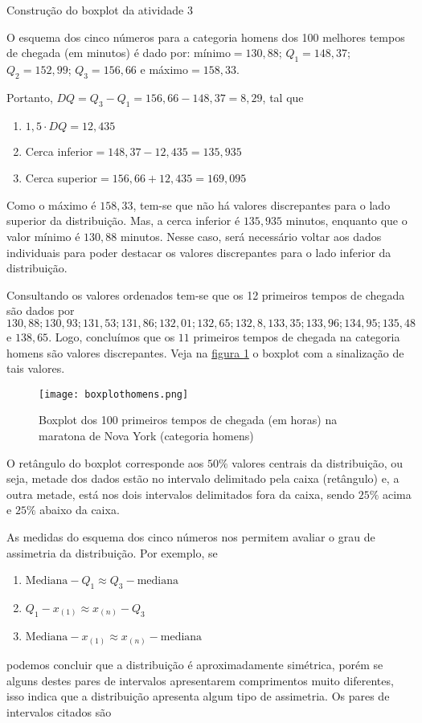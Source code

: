 \begin{example}{Construção do boxplot da atividade 3}

O esquema dos cinco números para a categoria homens dos 100 melhores tempos de chegada (em minutos) é dado por: mínimo$=130{,}88$; $Q_1=148{,}37$; $Q_2=152{,}99$; $Q_3=156{,}66$ e máximo$=158{,}33$.

Portanto, $DQ=Q_3-Q_1=156{,}66-148{,}37=8{,}29$, tal que
\begin{enumerate}
\item $1{,}5\cdot DQ=12{,}435$
\item Cerca inferior$=148{,}37-12{,}435=135{,}935$
\item Cerca superior$=156{,}66+12{,}435=169{,}095$
\end{enumerate}


Como o máximo é $158{,}33$, tem-se que não há valores discrepantes para o lado superior da distribuição. Mas, a cerca inferior é $135{,}935$ minutos, enquanto que o valor mínimo é $130{,}88$ minutos. Nesse caso, será necessário voltar aos dados individuais para poder destacar os valores discrepantes para o lado inferior da distribuição.

Consultando os valores ordenados tem-se que os 12 primeiros tempos de chegada são dados por $130{,}88; 130{,}93; 131{,}53; 131{,}86; 132{,}01; 132{,}65; 132{,}8, 133{,}35; 133{,}96; 134{,}95; 135{,}48$ e $138{,}65$. Logo, concluímos que os $11$ primeiros tempos de chegada na categoria homens são valores discrepantes. Veja na \hyperref[boxplothomens]{figura \ref{boxplothomens}} o boxplot com a sinalização de tais valores.

\begin{figure}[H]
\centering

\texttt{[image: boxplothomens.png]}
\caption{Boxplot dos 100 primeiros tempos de chegada (em horas) na maratona de Nova York (categoria homens)}
\label{boxplothomens}
\end{figure}
\end{example}

O retângulo do boxplot corresponde aos $50\%$ valores centrais da distribuição, ou seja, metade dos dados estão no intervalo delimitado pela caixa (retângulo) e, a outra metade, está nos dois intervalos delimitados fora da caixa, sendo $25\%$ acima e $25\%$ abaixo da caixa.

As medidas do esquema dos cinco números nos permitem avaliar o grau de assimetria da distribuição. Por exemplo, se

\begin{enumerate}
\item $\text{Mediana}-Q_1\approx Q_3-\text{mediana}$
\item $Q_1-x_{(1)}\approx x_{(n)}-Q_3$
\item $\text{Mediana}-x_{(1)}\approx x_{(n)}-\text{mediana}$
\end{enumerate}
podemos concluir que a distribuição é aproximadamente simétrica, porém se alguns destes pares de intervalos apresentarem comprimentos muito diferentes, isso indica que a distribuição apresenta algum tipo de assimetria. Os pares de intervalos citados são

